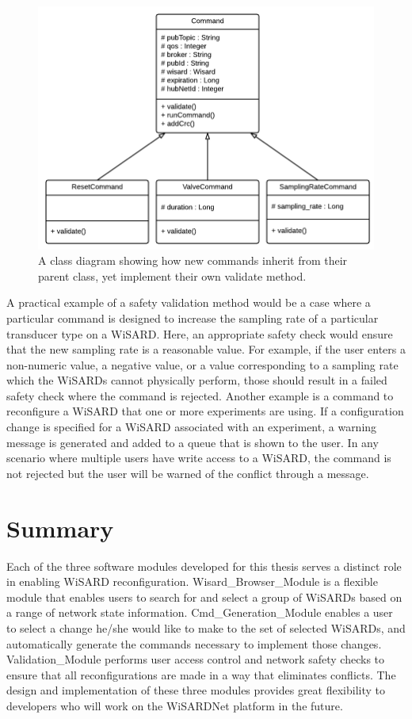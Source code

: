 \begin{figure}[H]
	\centering
	\includegraphics[width=\textwidth]{figures/command_class_diagram.png}
	\caption{A class diagram showing how new commands inherit from their parent class, yet implement their own validate method.}
	\label{fig:cmd_classes}
\end{figure}
 
 A practical example of a safety validation method would be a case where a particular command is designed to increase the sampling rate of a particular transducer type on a WiSARD. Here, an appropriate safety check would ensure that the new sampling rate is a reasonable value. For example, if the user enters a non-numeric value, a negative value, or a value corresponding to a sampling rate which the WiSARDs cannot physically perform, those should result in a failed safety check where the command is rejected. Another example is a command to reconfigure a WiSARD that one or more experiments are using. If a configuration change is specified for a WiSARD associated with an experiment, a warning message is generated and added to a queue that is shown to the user. In any scenario where multiple users have write access to a WiSARD, the command is not rejected but the user will be warned of the conflict through a message. 

\section{Summary}
Each of the three software modules developed for this thesis serves a distinct role in enabling WiSARD reconfiguration. Wisard\_Browser\_Module is a flexible module that enables users to search for and select a group of WiSARDs based on a range of network state information. Cmd\_Generation\_Module enables a user to select a change he/she would like to make to the set of selected WiSARDs, and automatically generate the commands necessary to implement those changes. Validation\_Module performs user access control and network safety checks to ensure that all reconfigurations are made in a way that eliminates conflicts. The design and implementation of these three modules provides great flexibility to developers who will work on the WiSARDNet platform in the future.

